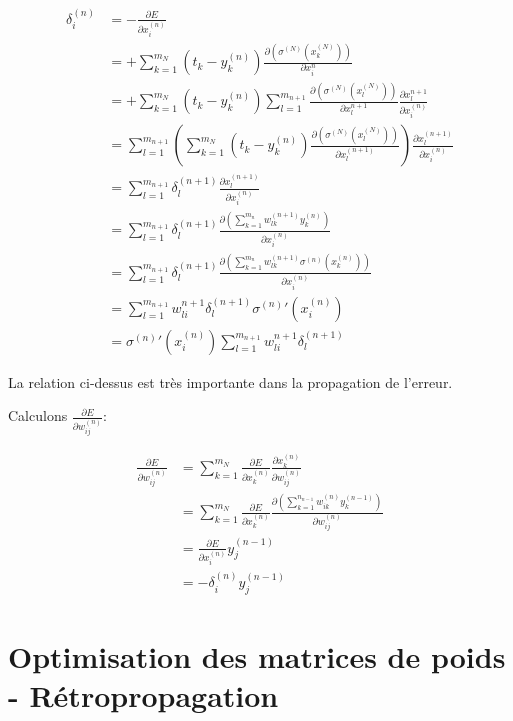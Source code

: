 \documentclass[11pt]{article}
\begin{document}
\begin{align}
\delta_{i}^{(n)}
& = -\frac{\partial E}{\partial x_{i}^{(n)}}\\
& = +\sum_{k=1}^{m_{N}}(t_{k}-y_{k}^{(n)})
\frac{\partial (\sigma^{(N)}(x_{k}^{(N)}))}{\partial x_{i}^{n}}\\
& = +\sum_{k=1}^{m_{N}}(t_{k}-y_{k}^{(n)})
\sum_{l=1}^{m_{n+1}}
\frac{\partial \left(\sigma^{(N)}(x_{l}^{(N)})\right)}
{\partial x_{l}^{n+1}}
\frac{\partial x_{l}^{n+1}}{\partial x_{i}^{(n)}}\\
& = \sum_{l=1}^{m_{n+1}}\left(\sum_{k=1}^{m_{N}}(t_{k}-y_{k}^{(n)})
\frac{\partial \left(\sigma^{(N)}(x_{l}^{(N)})\right)}
{\partial x_{l}^{(n+1)}}\right)
\frac{\partial x_{l}^{(n+1)}}{\partial x_{i}^{(n)}}\\
& = \sum_{l=1}^{m_{n+1}}\delta_{l}^{(n+1)}
\frac{\partial x_{l}^{(n+1)}}{\partial x_{i}^{(n)}}\\
& = \sum_{l=1}^{m_{n+1}}\delta_{l}^{(n+1)}
\frac{\partial \left(\sum_{k=1}^{m_{n}}w_{lk}^{(n+1)}y_{k}^{(n)}
\right)}{\partial x_{i}^{(n)}}\\
& = \sum_{l=1}^{m_{n+1}}\delta_{l}^{(n+1)}
\frac{\partial \left(\sum_{k=1}^{m_{n}}w_{lk}^{(n+1)}
\sigma^{(n)}(x_{k}^{(n)})
\right)}{\partial x_{i}^{(n)}}\\
& = \sum_{l=1}^{m_{n+1}}w_{li}^{n+1}\delta_{l}^{(n+1)}\sigma^{(n)}'(x_{i}^{(n)})\\
& = \sigma^{(n)}'(x_{i}^{(n)})\sum_{l=1}^{m_{n+1}}w_{li}^{n+1}\delta_{l}^{(n+1)}
\end{align}

La relation ci-dessus est très importante dans la propagation de l'erreur.

Calculons $\frac{\partial E}{\partial w_{ij}^{(n)}}$:

\begin{align}
\frac{\partial E}{\partial w_{ij}^{(n)}}
& = \sum_{k=1}^{m_{N}}\frac{\partial E}{\partial x_{k}^{(n)}}
\frac{\partial x_{k}^{(n)}}{\partial w_{ij}^{(n)}}\\
& = \sum_{k=1}^{m_{N}}\frac{\partial E}{\partial x_{k}^{(n)}}
\frac{\partial (\sum_{k=1}^{n_{n-1}}w_{ik}^{(n)}y_{k}^{(n-1)})}
{\partial w_{ij}^{(n)}}\\
& = \frac{\partial E}{\partial x_{i}^{(n)}}y_{j}^{(n-1)}\\
& = -\delta_{i}^{(n)}y_{j}^{(n-1)}
\end{align}


\section{Optimisation des matrices de poids - Rétropropagation}
\label{sec-5}
\end{document}
